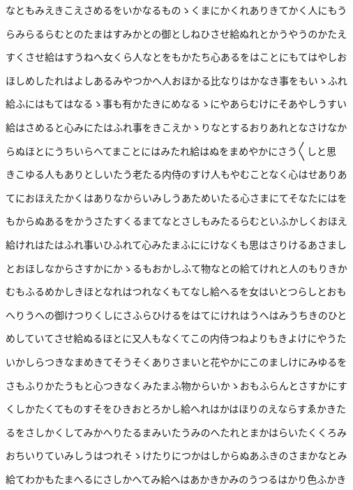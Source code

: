\documentclass[a4paper,11pt,landscape]{ltjtarticle}
\begin{document}
\par\medskip
なともみえきこえさめるをいかなるものゝくまにかくれありきてかく人にもう
\par\medskip
らみらるらむとのたまはすみかとの御としねひさせ給ぬれとかうやうのかたえ
\par\medskip
すくさせ給はすうねへ女くら人なとをもかたち心あるをはことにもてはやしお
\par\medskip
ほしめしたれはよしあるみやつかへ人おほかる比なりはかなき事をもいゝふれ
\par\medskip
給ふにはもてはなるゝ事も有かたきにめなるゝにやあらむけにそあやしうすい
\par\medskip
給はさめると心みにたはふれ事をきこえかゝりなとするおりあれとなさけなか
\par\medskip
らぬほとにうちいらへてまことにはみたれ給はぬをまめやかにさう〱しと思
\par\medskip
きこゆる人もありとしいたう老たる内侍のすけ人もやむことなく心はせありあ
\par\medskip
てにおほえたかくはありなからいみしうあためいたる心さまにてそなたにはを
\par\medskip
もからぬあるをかうさたすくるまてなとさしもみたるらむといふかしくおほえ
\par\medskip
給けれはたはふれ事いひふれて心みたまふににけなくも思はさりけるあさまし
\par\medskip
とおほしなからさすかにかゝるもおかしふて物なとの給てけれと人のもりきか
\par\medskip
むもふるめかしきほとなれはつれなくもてなし給へるを女はいとつらしとおも
\par\medskip
へりうへの御けつりくしにさふらひけるをはてにけれはうへはみうちきのひと
\par\medskip
めしていてさせ給ぬるほとに又人もなくてこの内侍つねよりもきよけにやうた
\par\medskip
いかしらつきなまめきてそうそくありさまいと花やかにこのましけにみゆるを
\par\medskip
さもふりかたうもと心つきなくみたまふ物からいかゝおもふらんとさすかにす
\par\medskip
くしかたくてものすそをひきおとろかし給へれはかはほりのえならすゑかきた
\par\medskip
るをさしかくしてみかへりたるまみいたうみのへたれとまかはらいたくくろみ
\par\medskip
おちいりていみしうはつれそゝけたりにつかはしからぬあふきのさまかなとみ
\par\medskip
給てわかもたまへるにさしかへてみ給へはあかきかみのうつるはかり色ふかき
\end{document}
